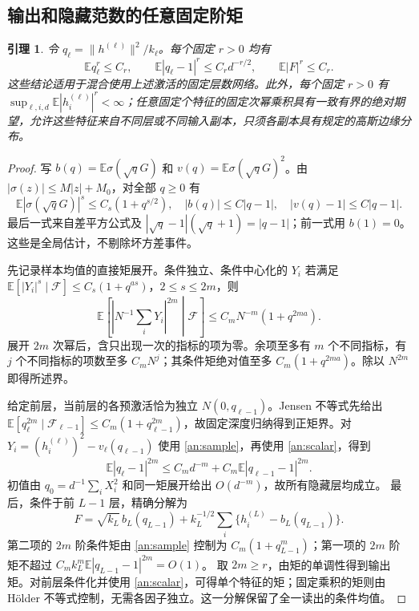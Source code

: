 \documentclass[a4paper]{tufte-handout}
\newtheorem{lemma}{引理}
\begin{document}
\begin{fullwidth}
\subsection{输出和隐藏范数的任意固定阶矩}
\begin{lemma}\label{an:moments}
令 $q_\ell=\|h^{(\ell)}\|^2/k_\ell$。每个固定 $r>0$ 均有
\[
 \mathbb E q_\ell^r\le C_r,\qquad
 \mathbb E|q_\ell-1|^r\le C_r d^{-r/2},\qquad
 \mathbb E|F|^r\le C_r.
\]
这些结论适用于混合使用上述激活的固定层数网络。此外，每个固定 $r>0$ 有 $\sup_{\ell,i,d}\mathbb E|h_i^{(\ell)}|^r<\infty$；任意固定个特征的固定次幂乘积具有一致有界的绝对期望，允许这些特征来自不同层或不同输入副本，只须各副本具有规定的高斯边缘分布。
\end{lemma}
\begin{proof}
写 $b(q)=\mathbb E\sigma(\sqrt qG)$ 和 $v(q)=\mathbb E\sigma(\sqrt qG)^2$。由 $|\sigma(z)|\le M|z|+M_0$，对全部 $q\ge0$ 有
\[
 \mathbb E|\sigma(\sqrt qG)|^s\le C_s(1+q^{s/2}),\quad
 |b(q)|\le C|q-1|,\quad |v(q)-1|\le C|q-1|. \tag{A1}\label{an:scalar}
\]
最后一式来自差平方公式及
$|\sqrt q-1|(\sqrt q+1)=|q-1|$；前一式用 $b(1)=0$。这些是全局估计，不剔除坏方差事件。

先记录样本均值的直接矩展开。条件独立、条件中心化的 $Y_i$ 若满足
$\mathbb E[|Y_i|^s\mid\mathcal F]\le C_s(1+q^{as})$，$2\le s\le2m$，则
\[
 \mathbb E\left[\left|N^{-1}\sum_iY_i\right|^{2m}\middle|\mathcal F\right]
 \le C_mN^{-m}(1+q^{2ma}). \tag{A2}\label{an:sample}
\]
展开 $2m$ 次幂后，含只出现一次的指标的项为零。余项至多有 $m$ 个不同指标，有 $j$ 个不同指标的项数至多 $C_mN^j$；其条件矩绝对值至多 $C_m(1+q^{2ma})$。除以 $N^{2m}$ 即得所述界。

给定前层，当前层的各预激活恰为独立 $N(0,q_{\ell-1})$。Jensen 不等式先给出
$\mathbb E[q_\ell^{2m}\mid\mathcal F_{\ell-1}]\le C_m(1+q_{\ell-1}^{2m})$，故固定深度归纳得到正矩界。对
$Y_i=(h_i^{(\ell)})^2-v_\ell(q_{\ell-1})$
使用 \eqref{an:sample}，再使用 \eqref{an:scalar}，得到
\[
 \mathbb E|q_\ell-1|^{2m}\le C_md^{-m}
       +C_m\mathbb E|q_{\ell-1}-1|^{2m}.
\]
初值由 $q_0=d^{-1}\sum_iX_i^2$ 和同一矩展开给出 $O(d^{-m})$，故所有隐藏层均成立。
最后，条件于前 $L-1$ 层，精确分解为
\[
 F=\sqrt{k_L}\,b_L(q_{L-1})+
 k_L^{-1/2}\sum_i\{h_i^{(L)}-b_L(q_{L-1})\}.
\]
第二项的 $2m$ 阶条件矩由 \eqref{an:sample} 控制为 $C_m(1+q_{L-1}^m)$；第一项的 $2m$ 阶矩不超过
$C_mk_L^m\mathbb E|q_{L-1}-1|^{2m}=O(1)$。
取 $2m\ge r$，由矩的单调性得到输出矩。对前层条件化并使用 \eqref{an:scalar}，可得单个特征的矩；固定乘积的矩则由 H\"older 不等式控制，无需各因子独立。这一分解保留了全一读出的条件均值。
\end{proof}


\end{fullwidth}
\end{document}

